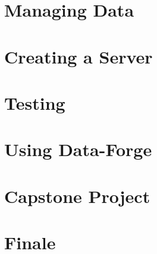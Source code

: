 \section*{Managing Data}


\section*{Creating a Server}


\section*{Testing}


\section*{Using Data-Forge}


\section*{Capstone Project}


\section*{Finale}

